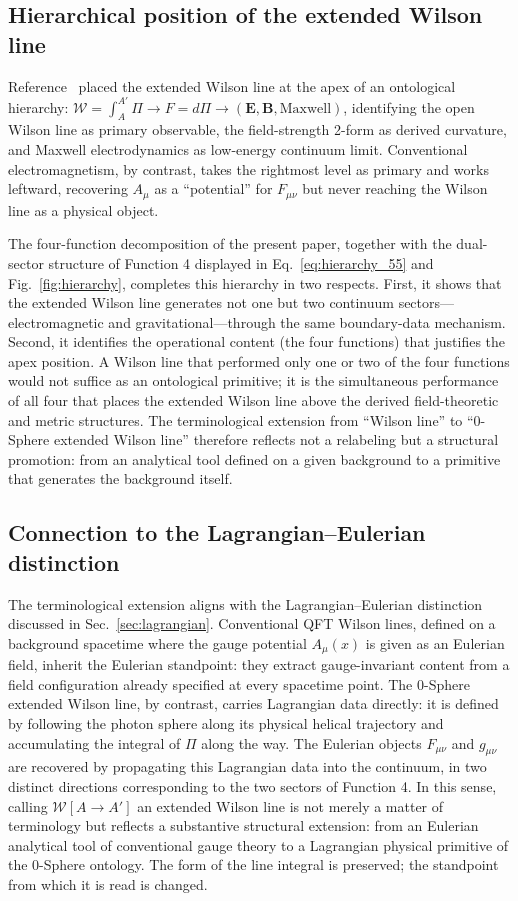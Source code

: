 \documentclass[%
 reprint, amsmath,amssymb, aps, prb, ]{revtex4-2}
\numberwithin{equation}{section}
\newcommand{\WL}{\mathcal{W}}
\begin{document}
\subsection{Hierarchical position of the extended Wilson line}

Reference~\cite{hanamura54} placed the extended Wilson line at the apex of an ontological hierarchy: $\WL = \int_A^{A'}\Pi \to F = d\Pi \to (\mathbf{E}, \mathbf{B}, \text{Maxwell})$, identifying the open Wilson line as primary observable, the field-strength 2-form as derived curvature, and Maxwell electrodynamics as low-energy continuum limit. Conventional electromagnetism, by contrast, takes the rightmost level as primary and works leftward, recovering $A_\mu$ as a ``potential'' for $F_{\mu\nu}$ but never reaching the Wilson line as a physical object.

The four-function decomposition of the present paper, together with the dual-sector structure of Function 4 displayed in Eq.~\eqref{eq:hierarchy_55} and Fig.~\ref{fig:hierarchy}, completes this hierarchy in two respects. First, it shows that the extended Wilson line generates not one but two continuum sectors---electromagnetic and gravitational---through the same boundary-data mechanism. Second, it identifies the operational content (the four functions) that justifies the apex position. A Wilson line that performed only one or two of the four functions would not suffice as an ontological primitive; it is the simultaneous performance of all four that places the extended Wilson line above the derived field-theoretic and metric structures. The terminological extension from ``Wilson line'' to ``0-Sphere extended Wilson line'' therefore reflects not a relabeling but a structural promotion: from an analytical tool defined on a given background to a primitive that generates the background itself.

\subsection{Connection to the Lagrangian--Eulerian distinction}

The terminological extension aligns with the Lagrangian--Eulerian distinction discussed in Sec.~\ref{sec:lagrangian}. Conventional QFT Wilson lines, defined on a background spacetime where the gauge potential $A_\mu(x)$ is given as an Eulerian field, inherit the Eulerian standpoint: they extract gauge-invariant content from a field configuration already specified at every spacetime point. The 0-Sphere extended Wilson line, by contrast, carries Lagrangian data directly: it is defined by following the photon sphere along its physical helical trajectory and accumulating the integral of $\Pi$ along the way. The Eulerian objects $F_{\mu\nu}$ and $g_{\mu\nu}$ are recovered by propagating this Lagrangian data into the continuum, in two distinct directions corresponding to the two sectors of Function 4. In this sense, calling $\WL[A\to A']$ an extended Wilson line is not merely a matter of terminology but reflects a substantive structural extension: from an Eulerian analytical tool of conventional gauge theory to a Lagrangian physical primitive of the 0-Sphere ontology. The form of the line integral is preserved; the standpoint from which it is read is changed.

\clearpage
\end{document}
